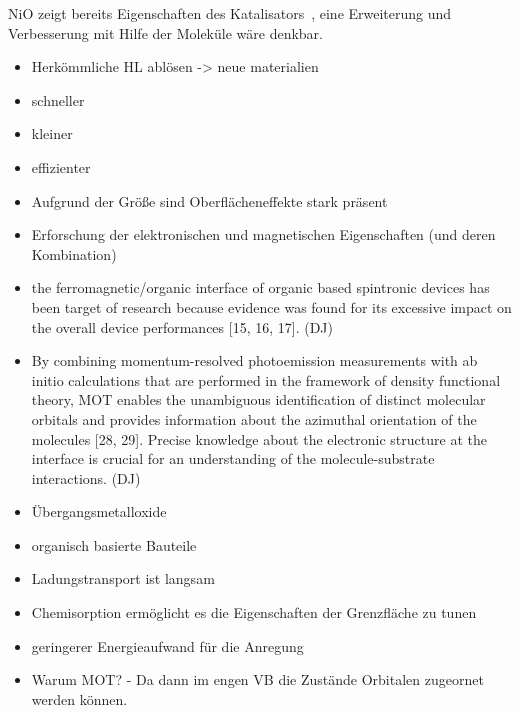     NiO zeigt bereits Eigenschaften des Katalisators~\cite{kunz_chemisorption_1985}, eine Erweiterung und Verbesserung mit Hilfe der Moleküle wäre denkbar.
\begin{itemize}
    \item Herkömmliche HL ablösen -> neue materialien
    \item schneller
    \item kleiner
    \item effizienter
    \item Aufgrund der Größe sind Oberflächeneffekte stark präsent
    \item Erforschung der elektronischen und magnetischen Eigenschaften (und deren Kombination)
    \item the ferromagnetic/organic interface of organic     based spintronic devices has been target of research because evidence was found for its excessive impact on the overall device performances [15, 16, 17]. (DJ)
    \item By combining momentum-resolved photoemission measurements with ab initio calculations that are performed in the framework of density functional theory, MOT enables the unambiguous identification of distinct molecular orbitals and provides information about the azimuthal orientation of the molecules [28, 29]. Precise knowledge about the electronic structure at the interface is crucial for an understanding of the molecule-substrate interactions. (DJ)
    \item Übergangsmetalloxide
    \item organisch basierte Bauteile
    \item Ladungstransport ist langsam
    \item Chemisorption ermöglicht es die Eigenschaften der Grenzfläche zu tunen
    \item geringerer Energieaufwand für die Anregung
    \item Warum MOT? - Da dann im engen VB die Zustände Orbitalen zugeornet werden können.
\end{itemize}